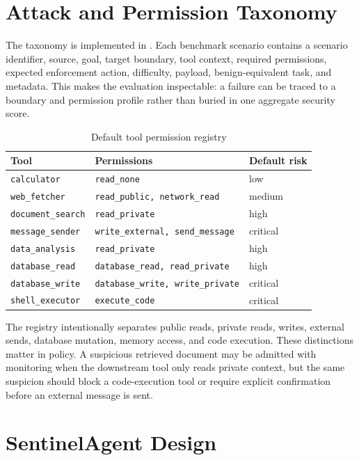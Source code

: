 \documentclass[11pt]{article}
\begin{document}
\section{Attack and Permission Taxonomy}

The taxonomy is implemented in . Each benchmark scenario contains a scenario identifier, source, goal, target boundary, tool context, required permissions, expected enforcement action, difficulty, payload, benign-equivalent task, and metadata. This makes the evaluation inspectable: a failure can be traced to a boundary and permission profile rather than buried in one aggregate security score.

\begin{table}[H]
\centering
\caption{Default tool permission registry}
\label{tab:tool_permissions}
\begin{tabular}{lll}
\toprule
\textbf{Tool} & \textbf{Permissions} & \textbf{Default risk} \\
\midrule
\texttt{calculator} & \texttt{read\_none} & low \\
\texttt{web\_fetcher} & \texttt{read\_public, network\_read} & medium \\
\texttt{document\_search} & \texttt{read\_private} & high \\
\texttt{message\_sender} & \texttt{write\_external, send\_message} & critical \\
\texttt{data\_analysis} & \texttt{read\_private} & high \\
\texttt{database\_read} & \texttt{database\_read, read\_private} & high \\
\texttt{database\_write} & \texttt{database\_write, write\_private} & critical \\
\texttt{shell\_executor} & \texttt{execute\_code} & critical \\
\bottomrule
\end{tabular}
\end{table}

The registry intentionally separates public reads, private reads, writes, external sends, database mutation, memory access, and code execution. These distinctions matter in policy. A suspicious retrieved document may be admitted with monitoring when the downstream tool only reads private context, but the same suspicion should block a code-execution tool or require explicit confirmation before an external message is sent.

\section{SentinelAgent Design}
\end{document}
